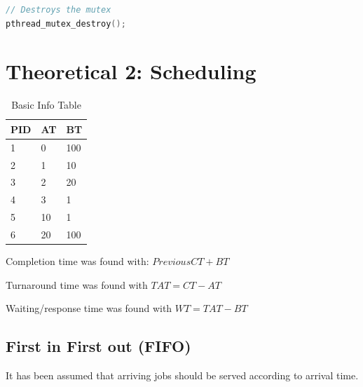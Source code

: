 \documentclass[11pt,a4paper]{article}
\theoremstyle{plain}
\theoremstyle{definition}
\theoremstyle{remark}
\numberwithin{equation}{section}
\begin{document}
\begin{lstlisting}[language=C,caption={Example Code},label={lst:ex_code1}]
// Destroys the mutex
pthread_mutex_destroy();
\end{lstlisting}

\section*{Theoretical 2: Scheduling}

\begin{table}[H]
	\centering
	\caption{Basic Info Table}
	\label{sch-basic}
	\begin{tabular}{lll}
		\hline
		\multicolumn{1}{|l|}{PID} & \multicolumn{1}{l|}{AT} & \multicolumn{1}{l|}{BT} \\ \hline
		1                         & 0                       & 100                     \\
		2                         & 1                       & 10                      \\
		3                         & 2                       & 20                      \\
		4                         & 3                       & 1                       \\
		5                         & 10                      & 1                       \\
		6                         & 20                      & 100                    
	\end{tabular}
\end{table}


Completion time was found with: $PreviousCT+BT$

Turnaround time was found with $TAT = CT-AT$

Waiting/response time was found with $WT = TAT-BT$


\subsection*{First in First out (FIFO)} %

It has been assumed that arriving jobs should be served according to arrival time.
\end{document}
